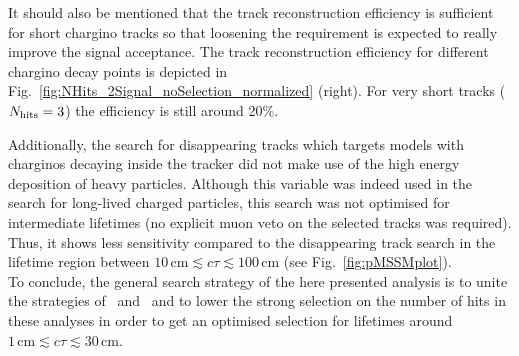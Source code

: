 It should also be mentioned that the track reconstruction efficiency is sufficient for short chargino tracks so that loosening the \nhits requirement is expected to really improve the signal acceptance. 
The track reconstruction efficiency for different chargino decay points is depicted in Fig.~\ref{fig:NHits_2Signal_noSelection_normalized} (right).
For very short tracks ($N_{\text{hits}}=3$) the efficiency is still around 20\%.



Additionally, the search for disappearing tracks which targets models with charginos decaying inside the tracker did not make use of the high energy deposition of heavy particles. 
Although this variable was indeed used in the search for long-lived charged particles, this search was not optimised for intermediate lifetimes (\eg no explicit muon veto on the selected tracks was required). 
Thus, it shows less sensitivity compared to the disappearing track search in the lifetime region between $10\,\text{cm} \lesssim c\tau \lesssim 100\,\text{cm}$ (see Fig.~\ref{fig:pMSSMplot}).\\

To conclude, the general search strategy of the here presented analysis is to unite the strategies of~\cite{bib:CMS:HSCP_8TeV} and~\cite{bib:CMS:DT_8TeV} and to lower the strong selection on the number of hits in these analyses in order to get an optimised selection for lifetimes around $1\,\text{cm} \lesssim c\tau \lesssim  30\,\text{cm}$.

